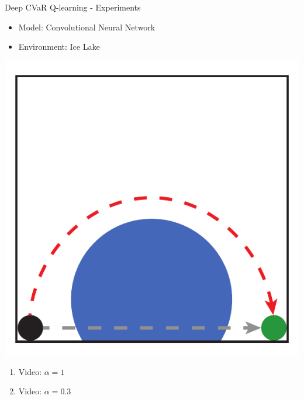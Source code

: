 \documentclass{beamer}
\begin{document}



\begin{frame}{Deep CVaR Q-learning - Experiments}
\begin{itemize}
\item Model: Convolutional Neural Network
\item Environment: Ice Lake
\end{itemize}

\center
\includegraphics[width=0.4\linewidth]{../gfx/icelake_full.pdf}


\begin{enumerate}
\item Video: $\alpha=1$
\item Video: $\alpha=0.3$
\end{enumerate}
\end{frame}
\end{document}
